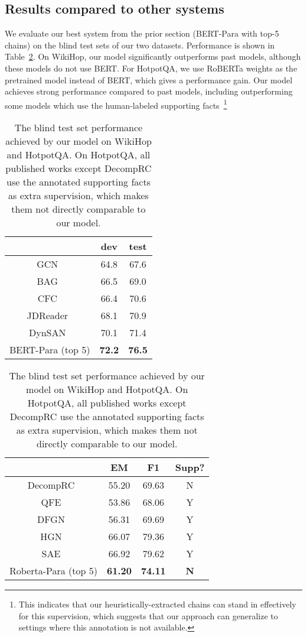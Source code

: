 \documentclass[11pt,a4paper]{article}
\begin{document}
\subsection{Results compared to other systems}
We evaluate our best system from the prior section (BERT-Para with top-5 chains) on the blind test sets of our two datasets. Performance is shown in Table~\ref{tab:test_results}. On WikiHop, our model significantly outperforms past models, although these models do not use BERT. For HotpotQA, we use RoBERTa \citep{roberta} weights as the pretrained model instead of BERT, which gives a performance gain. Our model achieves strong performance compared to past models, including outperforming some models which use the human-labeled supporting facts~\footnote{This indicates that our heuristically-extracted chains can stand in effectively for this supervision, which suggests that our approach can generalize to settings where this annotation is not available.}




\begin{table}[t]
\small
\centering
\renewcommand{\tabcolsep}{1.3mm}
\begin{tabular}{ c | c   c  }
\toprule
   & dev & test \\ 
\midrule
GCN~\citep{de2018question} & 64.8 & 67.6 \\
BAG~\citep{cao2019bag} & 66.5 & 69.0 \\
CFC~\citep{zhong2019coarse} & 66.4 & 70.6 \\
JDReader~\citep{tu2019multi} & 68.1 & 70.9 \\
DynSAN~\citep{zhuang2019token} & 70.1 & 71.4 \\
BERT-Para (top 5) & \textbf{72.2} & \textbf{76.5} \\
\bottomrule
\end{tabular}
\hfill
\begin{tabular}{ c | c   c | c }
\toprule
   & EM & F1 & Supp? \\ 
\midrule
DecompRC~\citep{MinZZH19} & 55.20 & 69.63 & N \\
QFE~\citep{Nishida2019QFE} & 53.86 & 68.06 & Y\\
DFGN~\citep{Qiu2019DFGN} & 56.31	& 69.69	 & Y \\
HGN~\citep{fang2019hierarchical} & 66.07 & 79.36 & Y \\
SAE~\citep{tu2019select} & 66.92 & 79.62 & Y \\
Roberta-Para (top 5) & \textbf{61.20}	 & \textbf{74.11}  & \textbf{N} \\
\bottomrule
\end{tabular}
\caption{The blind test set performance achieved by our model on WikiHop and HotpotQA. On HotpotQA, all published works except DecompRC use the annotated supporting facts as extra supervision, which makes them not directly comparable to our model.}
\label{tab:test_results}
\end{table}
\end{document}

